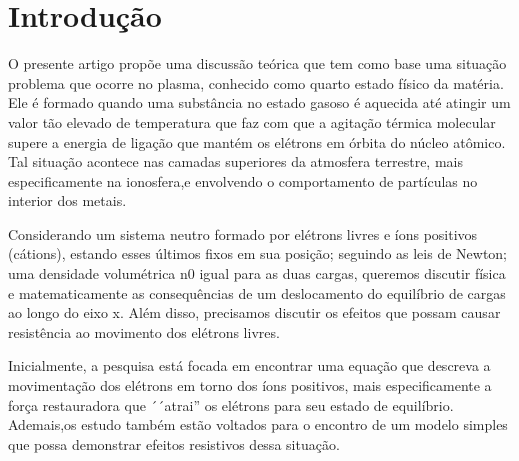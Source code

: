 \documentclass[
	article,
	11pt,
	oneside,
	a4paper,
	english,
	brazil,
	sumario=tradicional
	]{abntex2}
\begin{document}
\frenchspacing


\textual
\section{Introdução}

O presente artigo propõe uma discussão teórica que tem como base uma situação problema que ocorre no plasma, conhecido como quarto estado físico da matéria. Ele é formado quando uma substância no estado gasoso é aquecida até atingir um valor tão elevado de temperatura que faz com que a agitação térmica molecular supere a energia de ligação que mantém os elétrons em órbita do núcleo atômico. Tal situação acontece nas camadas superiores da atmosfera terrestre, mais especificamente na ionosfera,e envolvendo o comportamento de partículas no interior dos metais.

Considerando um sistema neutro formado por elétrons livres e íons positivos (cátions), estando esses últimos fixos em sua posição; seguindo as leis de Newton; uma densidade volumétrica n0 igual para as duas cargas, queremos discutir física e matematicamente as consequências de um deslocamento do equilíbrio de cargas ao longo do eixo x. Além disso, precisamos discutir os efeitos que possam causar resistência ao movimento dos elétrons livres.

Inicialmente, a pesquisa está focada em encontrar uma equação que descreva a movimentação dos elétrons em torno dos íons positivos, mais especificamente a força restauradora que ´´atrai'' os elétrons para seu estado de equilíbrio. Ademais,os estudo também estão voltados para o encontro de um modelo simples que possa demonstrar efeitos resistivos dessa situação.
\end{document}
